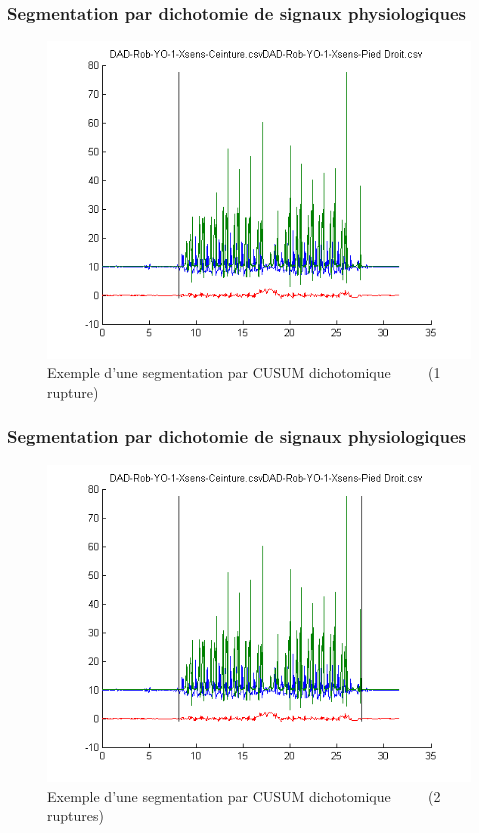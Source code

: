 \documentclass{beamer}
\begin{document}
\begin{frame}
	\frametitle{Segmentation par dichotomie de signaux physiologiques}
	\begin{figure}
		\includegraphics[scale=0.5]{dikt-seg1.png}
		\caption{Exemple d'une segmentation par CUSUM dichotomique
		~~~~
		(1 rupture)}
	\end{figure}
\end{frame}

\begin{frame}
	\frametitle{Segmentation par dichotomie de signaux physiologiques}
	\begin{figure}
		\includegraphics[scale=0.5]{dikt-seg2.png}
		\caption{Exemple d'une segmentation par CUSUM dichotomique 
		~~~~
		(2 ruptures)}
	\end{figure}
\end{frame}
\end{document}
